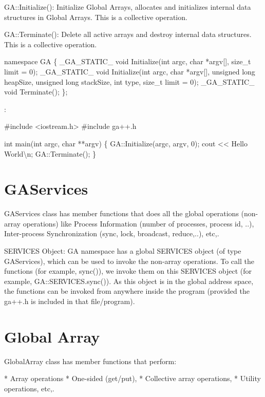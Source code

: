 GA::Initialize(): Initialize Global Arrays, allocates and initializes
internal data structures in Global Arrays. This is a collective operation.

GA::Terminate(): Delete all active arrays and destroy internal data
structures. This is a collective operation.

namespace GA \{ \_GA\_STATIC\_ void Initialize(int argc, char {*}argv{[}{]},
size\_t limit = 0); \_GA\_STATIC\_ void Initialize(int argc, char
{*}argv{[}{]}, unsigned long heapSize, unsigned long stackSize, int
type, size\_t limit = 0); \_GA\_STATIC\_ void Terminate(); \};

\emph{}: 

\#include <iostream.h> \#include \textquotedbl{}ga++.h\textquotedbl{}

int main(int argc, char {*}{*}argv) \{ GA::Initialize(argc, argv,
0); cout <\textcompwordmark{}< \textquotedbl{}Hello World\textbackslash{}n\textquotedbl{};
GA::Terminate(); \} 


\section{GAServices}

GAServices class has member functions that does all the global operations
(non-array operations) like Process Information (number of processes,
process id, ..), Inter-process Synchronization (sync, lock, broadcast,
reduce,..), etc,.

SERVICES Object: GA namespace has a global \textquotedbl{}SERVICES\textquotedbl{}
object (of type \textquotedbl{}GAServices\textquotedbl{}), which can
be used to invoke the non-array operations. To call the functions
(for example, sync()), we invoke them on this SERVICES object (for
example, GA::SERVICES.sync()). As this object is in the global address
space, the functions can be invoked from anywhere inside the program
(provided the ga++.h is included in that file/program). 


\section{Global Array}

GlobalArray class has member functions that perform:

{*} Array operations {*} One-sided (get/put), {*} Collective array
operations, {*} Utility operations, etc,. 
